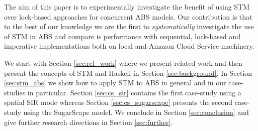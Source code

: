 The aim of this paper is to experimentally investigate the benefit of using STM over lock-based approaches for concurrent ABS models. Our contribution is that to the best of our knowledge we are the first to \textit{systematically} investigate the use of STM in ABS and compare is performance with sequential, lock-based and imperative implementations both on local and Amazon Cloud Service machinery.

We start with Section \ref{sec:rel_work} where we present related work and then present the concepts of STM and Haskell in Section \ref{sec:background}. In Section \ref{sec:stm_abs} we show how to apply STM to ABS in general and in our case-studies in particular. Section \ref{sec:cs_sir} contains the first case-study using a spatial SIR mode whereas Section \ref{sec:cs_sugarscape} presents the second case-study using the SugarScape model. We conclude in Section \ref{sec:conclusion} and give further research directions in Section \ref{sec:further}.